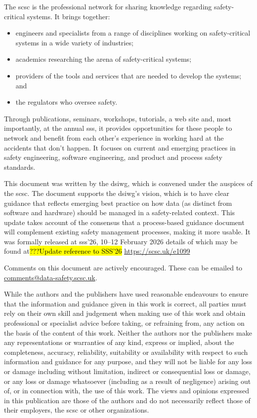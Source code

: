 The \gls{scsc} is the professional network for sharing knowledge regarding safety-critical systems. It brings together: 
\begin{itemize}
	\item engineers and specialists from a range of disciplines working on safety-critical systems in a wide variety of industries;
	\item academics researching the arena of safety-critical systems;
	\item providers of the tools and services that are needed to develop the systems; and
	\item the regulators who oversee safety.
\end{itemize}

Through publications, seminars, workshops, tutorials, a web site and, most importantly, at the annual \gls{sss}, it provides opportunities for these people to network and benefit from each other’s experience in working hard at the accidents that don’t happen. It focuses on current and emerging practices in safety engineering, software engineering, and product and process safety standards.

This document was written by the \gls{dsiwg}, which is convened under the auspices of the \gls{scsc}. The document supports the \gls{dsiwg}'s vision, which is to have clear guidance that reflects emerging best practice on how data (as distinct from software and hardware) should be managed in a safety-related context. This update takes account of the consensus that a process-based guidance document will complement existing safety management processes, making it more usable. It was formally released at
\cbstart\gls{sss}'26, 10--12 February 2026\cbend
details of which may be found at\hl{???Update reference to SSS'26}
\href{https://scsc.uk/e1099}{https://scsc.uk/e1099}%

Comments on this document are actively encouraged. These can be emailed to \href{mailto:comments@data-safety.scsc.uk}{comments@data-safety.scsc.uk}.

While the authors and the publishers have used reasonable endeavours to ensure that the information and guidance given in this work is correct, all parties must rely on their own skill and judgement when making use of this work and obtain professional or specialist advice before taking, or refraining from, any action on the basis of the content of this work. Neither the authors nor the publishers make any representations or warranties of any kind, express or implied, about the completeness, accuracy, reliability, suitability or availability with respect to such information and guidance for any purpose, and they will not be liable for any loss or damage including without limitation, indirect or consequential loss or damage, or any loss or damage whatsoever (including as a result of negligence) arising out of, or in connection with, the use of this work. The views and opinions expressed in this publication are those of the authors and do not necessarily reflect those of their employers, the \gls{scsc} or other organizations.


